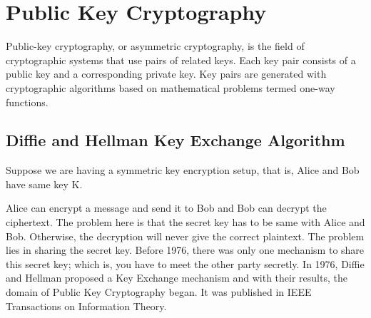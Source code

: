 \documentclass[11pt]{article}
\begin{document}

\section{Public Key Cryptography}
Public-key cryptography, or asymmetric cryptography, is the field of cryptographic systems that use pairs of related keys. Each key pair consists of a public key and a corresponding private key. Key pairs are generated with cryptographic algorithms based on mathematical problems termed one-way functions.

\subsection{Diffie and Hellman Key Exchange Algorithm}
Suppose we are having a symmetric key encryption setup, that is, Alice and Bob have same key K.
\begin{center}
\end{center}    
Alice can encrypt a message and send it to Bob and Bob can decrypt the ciphertext. The problem here is that the secret key has to be same with Alice and Bob. Otherwise, the decryption will never give the correct plaintext. The problem lies in sharing the secret key. Before 1976, there was only one mechanism to share this secret key; which is, you have to meet the other party secretly. In 1976, Diffie and Hellman proposed a Key Exchange mechanism and with their results, the domain of Public Key Cryptography began. It was published in IEEE Transactions on Information Theory.\\
\newline
\end{document}

